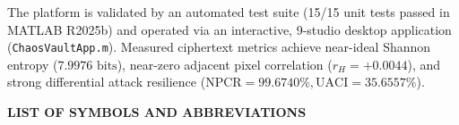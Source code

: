 \documentclass[12pt,a4paper,oneside]{report}
\begin{document}
The platform is validated by an automated test suite (15/15 unit tests passed in MATLAB R2025b) and operated via an interactive, 9-studio desktop application (\texttt{ChaosVaultApp.m}). Measured ciphertext metrics achieve near-ideal Shannon entropy ($7.9976\text{ bits}$), near-zero adjacent pixel correlation ($r_H = +0.0044$), and strong differential attack resilience ($\text{NPCR} = 99.6740\%, \text{UACI} = 35.6557\%$).

\newpage
\tableofcontents

\newpage
\listoffigures

\newpage
\listoftables

\newpage
\thispagestyle{plain}
\begin{center}
    {\Large \bfseries LIST OF SYMBOLS AND ABBREVIATIONS} \par
\end{center}
\vspace{0.6cm}
\end{document}
